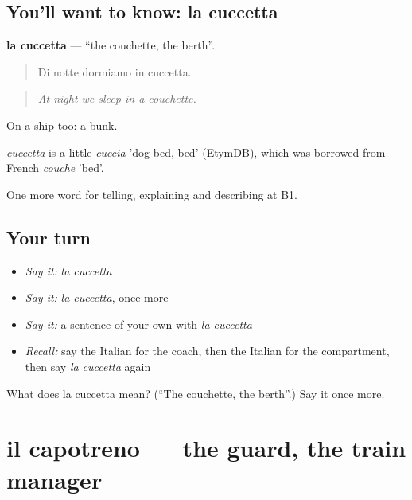 \subsection*{You'll want to know: la cuccetta}
\textbf{la cuccetta} — \textquotedblleft{}the couchette, the berth\textquotedblright{}.

\begin{quote}
Di notte dormiamo in cuccetta.
\end{quote}

\begin{quote}
\emph{At night we sleep in a couchette.}
\end{quote}

On a ship too: a bunk.

\begin{cousinweb}
\emph{cuccetta} is a little \emph{cuccia} 'dog bed, bed' (EtymDB), which was borrowed from French \emph{couche} 'bed'.
\end{cousinweb}

\begin{grammarlens}[title={What you've built}]
One more word for telling, explaining and describing at B1.
\end{grammarlens}

\subsection*{Your turn}
\begin{itemize}
\raggedright
  \item \emph{Say it:} \emph{la cuccetta}
  \item \emph{Say it:} \emph{la cuccetta}, once more
  \item \emph{Say it:} a sentence of your own with \emph{la cuccetta}
  \item \emph{Recall:} say the Italian for the coach, then the Italian for the compartment, then say \emph{la cuccetta} again
\end{itemize}

\begin{tcolorbox}[breakable,colback=teal!4,colframe=teal!35!black,title={Before you move on}]
What does la cuccetta mean? (\textquotedblleft{}The couchette, the berth\textquotedblright{}.) Say it once more.
\end{tcolorbox}
\section[il capotreno]{il capotreno — the guard, the train manager}

